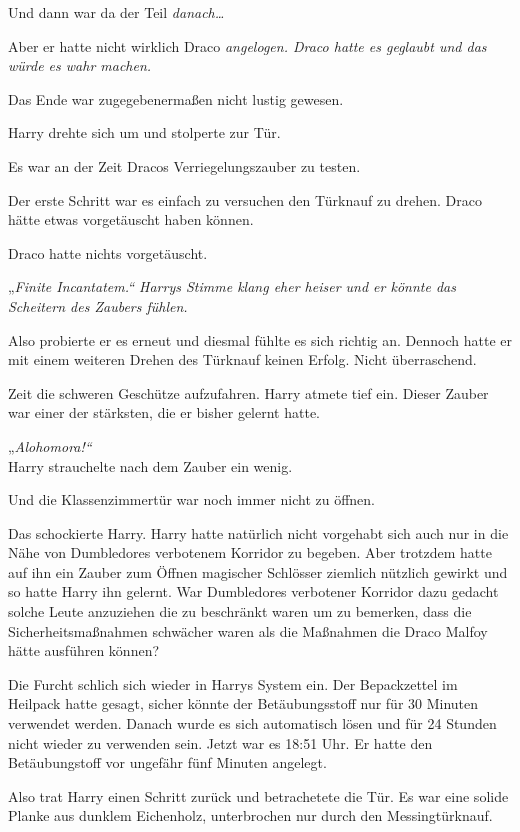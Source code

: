 {Und dann war da der Teil \emph{danach…}

Aber er hatte nicht wirklich Draco \emph{angelogen. Draco hatte es geglaubt und \emph{das würde es wahr machen.}}

Das Ende war zugegebenermaßen nicht lustig gewesen.

Harry drehte sich um und stolperte zur Tür.

Es war an der Zeit Dracos Verriegelungszauber zu testen.

Der erste Schritt war es einfach zu versuchen den Türknauf zu drehen. Draco hätte etwas vorgetäuscht haben können.

Draco hatte nichts vorgetäuscht.

„\emph{Finite Incantatem.“ Harrys Stimme klang eher heiser und er könnte das Scheitern des Zaubers fühlen.}

Also probierte er es erneut und diesmal fühlte es sich richtig an. Dennoch hatte er mit einem weiteren Drehen des Türknauf keinen Erfolg. Nicht überraschend.

Zeit die schweren Geschütze aufzufahren. Harry atmete tief ein. Dieser Zauber war einer der stärksten, die er bisher gelernt hatte.

„\emph{Alohomora!“}\\ Harry strauchelte nach dem Zauber ein wenig.

Und die Klassenzimmertür war noch immer nicht zu öffnen.

Das schockierte Harry. Harry hatte natürlich nicht vorgehabt sich auch nur in die Nähe von Dumbledores verbotenem Korridor zu begeben. Aber trotzdem hatte auf ihn ein Zauber zum Öffnen magischer Schlösser ziemlich nützlich gewirkt und so hatte Harry ihn gelernt. War Dumbledores verbotener Korridor dazu gedacht solche Leute anzuziehen die zu beschränkt waren um zu bemerken, dass die Sicherheitsmaßnahmen schwächer waren als die Maßnahmen die Draco Malfoy hätte ausführen können?

Die Furcht schlich sich wieder in Harrys System ein. Der Bepackzettel im Heilpack hatte gesagt, sicher könnte der Betäubungsstoff nur für 30 Minuten verwendet werden. Danach wurde es sich automatisch lösen und für 24 Stunden nicht wieder zu verwenden sein. Jetzt war es 18:51 Uhr. Er hatte den Betäubungstoff vor ungefähr fünf Minuten angelegt.

Also trat Harry einen Schritt zurück und betrachetete die Tür. Es war eine solide Planke aus dunklem Eichenholz, unterbrochen nur durch den Messingtürknauf.

}
